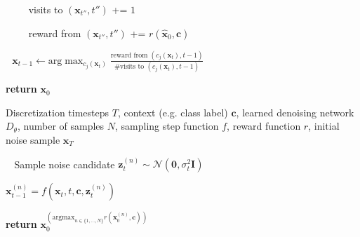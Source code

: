 \documentclass{article}
\newcommand{\x}{\mathbf{x}}
\newcommand{\N}{\mathcal{N}}
\begin{document}
\begin{algorithm}
\begin{algorithmic}[1]
         \text{$\qquad\qquad\qquad\qquad\qquad\qquad\quad\:\:\:\:\:\qquad\qquad$\textcolor{gray}{// backpropagation}}
        
            $\qquad$ visits to $(\x_{t''},t'')$ += $1$
            
            $\qquad$ reward from $(\x_{t''},t'')$ += $r(\hat{\x}_0,\mathbf{c})$
            
        \EndFor

        $\:\:\:$$\x_{t-1} \leftarrow \text{arg}\max_{c_j(\x_t)} \frac{\text{reward from }(c_j(\x_t),t-1)}{\text{\# visits to }(c_j(\x_t),t-1)}$

    \EndFor

    
\EndFor

\State \textbf{return} $\x_0$
\end{algorithmic}
\end{algorithm}

\begin{algorithm}
\caption{Rejection Sampling}
\label{alg:rs}
\begin{algorithmic}[1]
\Require Discretization timesteps $T$, 
         context (e.g. class label) $\mathbf{c}$,
         learned denoising network $D_\theta$,
        number of samples $N$, sampling step function $f$, reward function $r$, initial noise sample $\x_T$


    \vspace{1mm}
    
        $\:\:\:\:$Sample noise candidate $\mathbf{z}_t^{(n)} \sim \N(\mathbf{0}, \sigma_t^2\mathbf{I})$
    
        \State $\x_{t-1}^{(n)} = f(\x_t, t, \mathbf{c}, \mathbf{z}_t^{(n)})$
        
    \EndFor
    \EndFor

    

\State \textbf{return} $\x_0^{(\textrm{argmax}_{n \in \{1,\dots,N\}} r\left(\x_0^{(n)},\mathbf{c}\right))}$
\end{algorithmic}
\end{algorithm}
\end{document}
